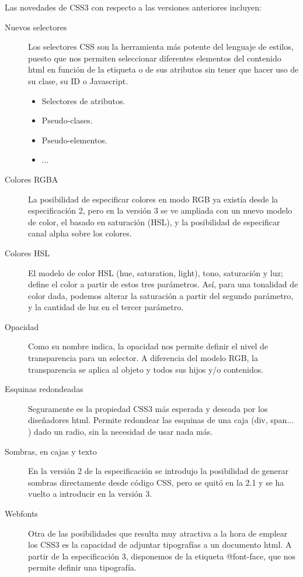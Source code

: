 Las novedades de CSS3 con respecto a las versiones anteriores incluyen:
\begin{description}
    \item[Nuevos selectores] Los selectores CSS son la herramienta más potente del lenguaje de estilos, puesto que nos permiten seleccionar diferentes elementos del contenido html en función de la etiqueta o de sus atributos sin tener que hacer uso de su clase, su ID o Javascript.
    \begin{itemize}
        \item Selectores de atributos.
        \item Pseudo-clases.
        \item Pseudo-elementos.
        \item ...
    \end{itemize}
    
    \item[Colores RGBA] La posibilidad de especificar colores en modo RGB ya existía desde la especificación 2, pero en la versión 3 se ve ampliada con un nuevo modelo de color, el basado en saturación (HSL), y la posibilidad de especificar canal alpha sobre
    los colores.
    
    \item[Colores HSL] El modelo de color HSL (hue, saturation, light), tono, saturación y luz; define el color a partir de estos tres parámetros. Así, para una tonalidad de color dada, podemos alterar la saturación a partir del segundo parámetro, y la cantidad de  luz en el tercer parámetro.
    
    \item[Opacidad] Como su nombre indica, la opacidad nos permite definir el nivel de transparencia para un selector. A diferencia del modelo RGB, la transparencia se aplica
    al objeto y todos sus hijos y/o contenidos.
    
    \item[Esquinas redondeadas] Seguramente es la propiedad CSS3 más esperada y deseada por los diseñadores html. Permite redondear las esquinas de una caja (div, span... ) dado un radio, sin la necesidad de usar nada más.
    
    \item[Sombras, en cajas y texto] En la versión 2 de la especificación se introdujo la posibilidad de generar sombras directamente desde código CSS, pero se quitó en la 2.1 y se ha vuelto a introducir en la versión 3.
    
    \item[Webfonts] Otra de las posibilidades que resulta muy atractiva a la hora de emplear los CSS3 es la capacidad de adjuntar tipografías a un documento html. A partir de la especificación 3, disponemos de la etiqueta @font-face, que nos permite definir una tipografía.
    

\end{description}

